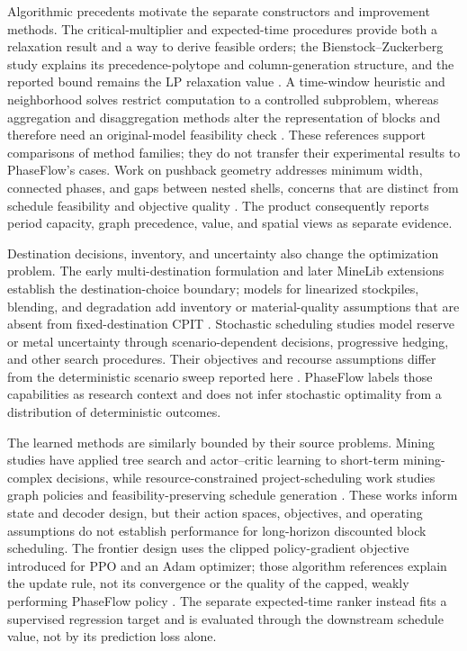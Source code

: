 \documentclass[11pt]{article}
\begin{document}
Algorithmic precedents motivate the separate constructors and improvement methods. The critical-multiplier and expected-time procedures provide both a relaxation result and a way to derive feasible orders; the Bienstock--Zuckerberg study explains its precedence-polytope and column-generation structure, and the reported bound remains the LP relaxation value \cite{chicoisne,munoz2017,bienstock}. A time-window heuristic and neighborhood solves restrict computation to a controlled subproblem, whereas aggregation and disaggregation methods alter the representation of blocks and therefore need an original-model feasibility check \cite{cullenbine2011,boland2009,jelvez2016,askari2010,blom}. These references support comparisons of method families; they do not transfer their experimental results to PhaseFlow's cases. Work on pushback geometry addresses minimum width, connected phases, and gaps between nested shells, concerns that are distinct from schedule feasibility and objective quality \cite{bai2018,meagher2014,morales2015}. The product consequently reports period capacity, graph precedence, value, and spatial views as separate evidence.

Destination decisions, inventory, and uncertainty also change the optimization problem. The early multi-destination formulation and later MineLib extensions establish the destination-choice boundary; models for linearized stockpiles, blending, and degradation add inventory or material-quality assumptions that are absent from fixed-destination CPIT \cite{johnson1968,jelvez2018,moreno2017,rezakhah2020blend,rezakhah2020degrade}. Stochastic scheduling studies model reserve or metal uncertainty through scenario-dependent decisions, progressive hedging, and other search procedures. Their objectives and recourse assumptions differ from the deterministic scenario sweep reported here \cite{ramazan2013,goodfellow2016,lamghari2012,lamghari2016}. PhaseFlow labels those capabilities as research context and does not infer stochastic optimality from a distribution of deterministic outcomes.

The learned methods are similarly bounded by their source problems. Mining studies have applied tree search and actor--critic learning to short-term mining-complex decisions, while resource-constrained project-scheduling work studies graph policies and feasibility-preserving schedule generation \cite{kumar2021,carvalho2023,teichteil2023,zhao2022}. These works inform state and decoder design, but their action spaces, objectives, and operating assumptions do not establish performance for long-horizon discounted block scheduling. The frontier design uses the clipped policy-gradient objective introduced for PPO and an Adam optimizer; those algorithm references explain the update rule, not its convergence or the quality of the capped, weakly performing PhaseFlow policy \cite{schulman2017,kingma}. The separate expected-time ranker instead fits a supervised regression target and is evaluated through the downstream schedule value, not by its prediction loss alone.
\end{document}
